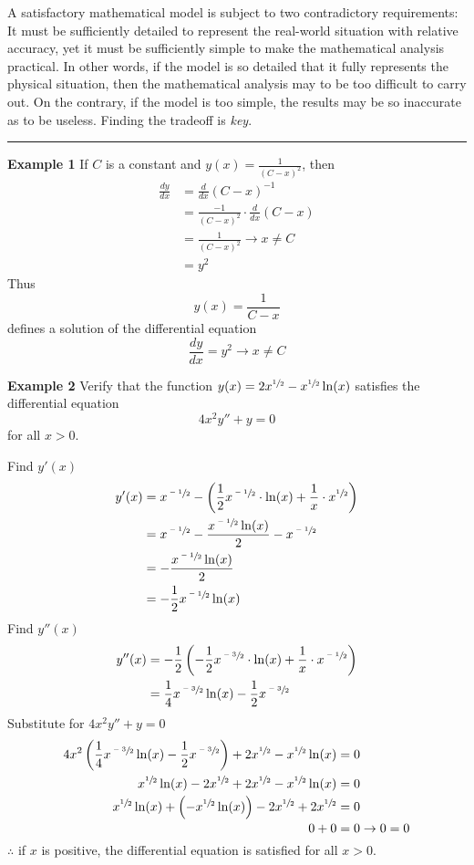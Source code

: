 \documentclass{article}
\begin{document}
A satisfactory mathematical model is subject to two contradictory requirements: It must be sufficiently detailed to represent the real-world situation with relative accuracy, yet it must be sufficiently simple to make the mathematical analysis practical. In other words, if the model is so detailed that it fully represents the physical situation, then the mathematical analysis may to be too difficult to carry out. On the contrary, if the model is too simple, the results may be so inaccurate as to be useless. Finding the tradeoff is \textit{key}.

\par\noindent\rule{\textwidth}{0.4pt}

\textbf{Example 1}
If $ C $ is a constant and $ y(x) = \frac{1}{(C-x)^2} $, then
\begin{align*}
    \frac{dy}{dx} & = \frac{d}{dx} \left(C-x\right)^{-1} \\
                  & = \frac{-1}{\left(C-x\right)^2} \cdot \frac{d}{dx}\left(C-x\right) \\
                  & = \frac{1}{\left(C-x\right)^2} \rightarrow x \neq C \\
                  & = y^2
\end{align*}
Thus
$$ y(x) = \frac{1}{C-x} $$
defines a solution of the differential equation
$$ \frac{dy}{dx} = y^2 \rightarrow x \neq C $$

\textbf{Example 2}
Verify that the function $ y(x) = 2x^{\sfrac{1}{2}} - x^{\sfrac{1}{2}}\ln(x) $ satisfies the differential equation
$$ 4x^2y'' + y = 0 $$
for all $ x > 0 $.

Find $ y'(x) $
\begin{align*}
    y'(x) & = x^{\sfrac{-1}{2}} - \left( \frac{1}{2}x^{\sfrac{-1}{2}} \cdot \ln(x) + \frac{1}{x} \cdot x^{\sfrac{1}{2}} \right) \\
          & = x^{\sfrac{-1}{2}} - \frac{x^{\sfrac{-1}{2}}\ln(x)}{2} - x^{\sfrac{-1}{2}} \\
          & = -\frac{x^{\sfrac{-1}{2}}\ln(x)}{2} \\
          & = -\frac{1}{2}x^{\sfrac{-1}{2}}\ln(x)
\end{align*}
Find $ y''(x) $
\begin{align*}
    y''(x) & = -\frac{1}{2} \left( -\frac{1}{2}x^{\sfrac{-3}{2}} \cdot \ln(x) + \frac{1}{x} \cdot x^{\sfrac{-1}{2}} \right) \\
           & = \frac{1}{4}x^{\sfrac{-3}{2}}\ln(x) - \frac{1}{2}x^{\sfrac{-3}{2}}
\end{align*}
Substitute for $ 4x^2y'' + y = 0 $
\begin{align*}
    4x^2 \left( \frac{1}{4}x^{\sfrac{-3}{2}}\ln(x) - \frac{1}{2}x^{\sfrac{-3}{2}} \right) + 2x^{\sfrac{1}{2}} - x^{\sfrac{1}{2}}\ln(x) & = 0 \\
    x^{\sfrac{1}{2}}\ln(x) - 2x^{\sfrac{1}{2}} + 2x^{\sfrac{1}{2}} - x^{\sfrac{1}{2}}\ln(x) & = 0 \\
    x^{\sfrac{1}{2}}\ln(x) + \left( -x^{\sfrac{1}{2}}\ln(x) \right) - 2x^{\sfrac{1}{2}} + 2x^{\sfrac{1}{2}} & = 0 \\
    0 + 0 & = 0 \rightarrow 0 = 0
\end{align*}
$ \therefore $ if $ x $ is positive, the differential equation is satisfied for all $ x > 0 $.
\end{document}
